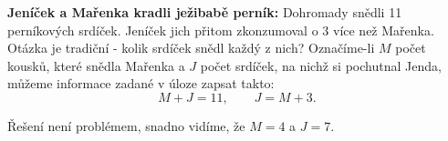 \begin{mdframed}[style=mdexam]
  \begin{example}\label{mai:exam037}
    \textbf{Jeníček a Mařenka kradli ježibabě perník:}\newline
    Dohromady snědli \num{11} perníkových srdíček. Jeníček jich přitom zkonzumoval o \num{3} více
    než Mařenka. Otázka je tradiční - kolik srdíček snědl každý z nich? Označíme-li \(M\) počet
    kousků, které snědla Mařenka a \(J\) počet srdíček, na nichž si pochutnal Jenda, můžeme
    informace zadané v úloze zapsat takto:
    \begin{equation*}
      M + J = 11, \qquad J = M + 3.
    \end{equation*}
    
    Řešení není problémem, snadno vidíme, že \(M = 4\) a \(J = 7\).
  \end{example}
\end{mdframed}